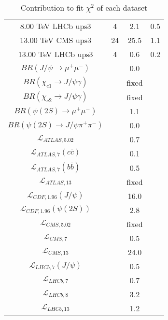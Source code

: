 \begin{table}[h!]
\begin{tabular}{c|c|c|c}
8.00 TeV LHCb ups3 & 4 & 2.1 & 0.5 \\
13.00 TeV CMS ups3 & 24 & 25.5 & 1.1 \\
13.00 TeV LHCb ups3 & 4 & 0.6 & 0.2 \\
\hline
$BR(J/\psi\rightarrow\mu^+\mu^-)$ &  & 0.0 &  \\
$BR(\chi_{c1}\rightarrow J/\psi\gamma)$ &  & fixed & \\
$BR(\chi_{c2}\rightarrow J/\psi\gamma)$ &  & fixed & \\
$BR(\psi(2S)\rightarrow\mu^+\mu^-)$ &  & 1.1 &  \\
$BR(\psi(2S)\rightarrow J/\psi\pi^+\pi^-)$ &  & 0.0 &  \\
$\mathcal L_{ATLAS,5.02}$ &  & 0.7 &  \\
$\mathcal L_{ATLAS,7}(c\overline c)$ &  & 0.1 &  \\
$\mathcal L_{ATLAS,7}(b\overline b)$ &  & 0.5 &  \\
$\mathcal L_{ATLAS,13}$ &  & fixed & \\
$\mathcal L_{CDF,1.96}(J/\psi)$ &  & 16.0 &  \\
$\mathcal L_{CDF,1.96}(\psi(2S))$ &  & 2.8 &  \\
$\mathcal L_{CMS,5.02}$ &  & fixed & \\
$\mathcal L_{CMS,7}$ &  & 0.5 &  \\
$\mathcal L_{CMS,13}$ &  & 24.0 &  \\
$\mathcal L_{LHCb,7}(J/\psi)$ &  & 0.5 &  \\
$\mathcal L_{LHCb,7}$ &  & 0.7 &  \\
$\mathcal L_{LHCb,8}$ &  & 3.2 &  \\
$\mathcal L_{LHCb,13}$ &  & 1.2 &  \\
\end{tabular}
\caption{Contribution to fit $\chi^2$ of each dataset}
\end{table}

